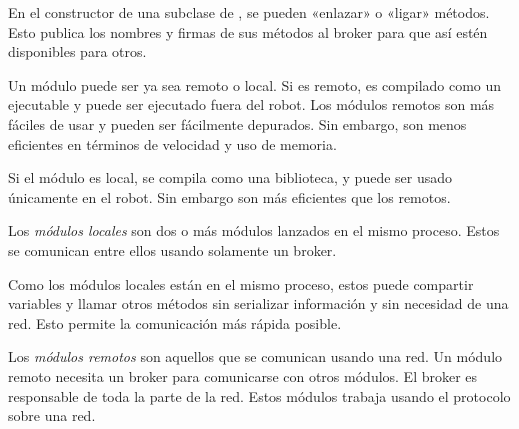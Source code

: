 En el constructor de una subclase de , se pueden «enlazar» o
«ligar» 
métodos. Esto publica los nombres y firmas de sus métodos al broker para que así
estén disponibles para otros.

Un módulo puede ser ya sea remoto o local. Si es remoto, es compilado como un ejecutable y puede ser ejecutado fuera del robot.
Los módulos remotos son más fáciles de usar y pueden ser fácilmente depurados. Sin
embargo, son menos eficientes en términos de velocidad y uso de memoria.

Si el módulo es local, se compila como una biblioteca, y puede ser usado
únicamente en el robot. Sin embargo son más eficientes que los remotos.



Los \textit{módulos locales} son dos o más módulos lanzados en el mismo proceso. Estos
se comunican entre ellos usando solamente un broker.

Como los módulos locales están en el mismo proceso, estos puede compartir
variables y llamar otros métodos sin serializar información y sin necesidad de
una red. Esto permite la comunicación más rápida posible.


Los \textit{módulos remotos} son aquellos que se comunican usando una red. Un módulo
remoto necesita un broker para comunicarse con otros módulos. El broker es
responsable de toda la parte de la red. Estos módulos trabaja usando el
protocolo  sobre una red.


